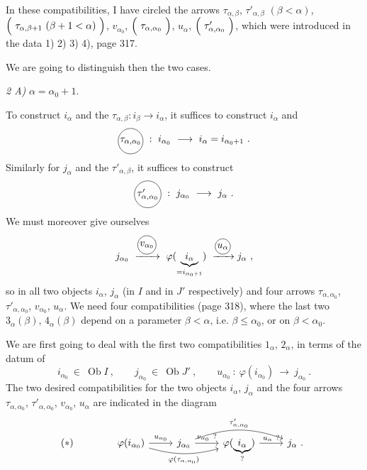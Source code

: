 \documentclass[11pt]{article}
\newcommand{\msp}[1]{\marginpar{\footnotesize [#1]}}
\newcommand{\circled}[1]{\tikz[baseline=(c.base)]\node[draw,circle,inner sep=1pt](c){#1};}
\newcommand{\Ob}{\operatorname{Ob}}
\begin{document}
In these compatibilities, I have circled the arrows $\tau_{\alpha,\beta}$, $\tau'_{\alpha,\beta}$ $(\beta<\alpha)$, $\Bigl(\ \tau_{\alpha,\beta+1}\ (\beta+1<\alpha)\ \Bigr)$, $v_{\alpha_0}$, $\Bigl(\ \tau_{\alpha,\alpha_0}\ \Bigr)$, $u_\alpha$, $\Bigl(\ \tau'_{\alpha,\alpha_0}\ \Bigr)$, which were introduced in the data 1) 2) 3) 4), page 317. %

\msp{page 319}

We are going to distinguish then the two cases.

\textit{2 A)} $\alpha=\alpha_0+1$.

To construct $i_\alpha$ and the $\tau_{\alpha,\beta}:i_\beta\longrightarrow i_\alpha$, it suffices to construct $i_\alpha$ and
\[
\circled{$\tau_{\alpha,\alpha_0}$}\ :\ i_{\alpha_0}\ \longrightarrow\ i_\alpha=i_{\alpha_0+1}\ .
\]
Similarly for $j_\alpha$ and the $\tau'_{\alpha,\beta}$, it suffices to construct
\[
\circled{$\tau'_{\alpha,\alpha_0}$}\ :\ j_{\alpha_0}\ \longrightarrow\ j_\alpha\ .
\]
We must moreover give ourselves
\[
j_{\alpha_0}\ \xrightarrow{\circled{$v_{\alpha_0}$}}\ \varphi(\underbrace{\,i_\alpha\,}_{=i_{\alpha_0+1}})\ \xrightarrow{\circled{$u_\alpha$}} j_\alpha\ ,
\]
so in all two objects $i_\alpha$, $j_\alpha$ (in $I$ and in $J'$ respectively) and four arrows $\tau_{\alpha,\alpha_0}$, $\tau'_{\alpha,\alpha_0}$, $v_{\alpha_0}$, $u_\alpha$. We need four compatibilities (page 318), where the last two $3_\alpha(\beta)$, $4_\alpha(\beta)$ depend on a parameter $\beta<\alpha$, i.e. $\beta\leqslant\alpha_0$, or on $\beta<\alpha_0$.

\msp{page 320: struck through}

\msp{page 321}

We are first going to deal with the first two compatibilities $1_\alpha$, $2_\alpha$, in terms of the datum of
\[
i_{\alpha_0}\ \in\ \Ob I\ ,\qquad j_{\alpha_0}\ \in\ \Ob J'\ ,\qquad u_{\alpha_0}\ :\ \varphi(i_{\alpha_0})\ \longrightarrow\ j_{\alpha_0}\ .
\]
The two desired compatibilities for the two objects $i_\alpha$, $j_\alpha$ and the four arrows $\tau_{\alpha,\alpha_0}$, $\tau'_{\alpha,\alpha_0}$, $v_{\alpha_0}$, $u_\alpha$ are indicated in the diagram
\[
(*)\qquad\qquad
\begin{tikzcd}
\varphi(i_{\alpha_0}) \arrow[r, "u_{\alpha_0}"] \arrow[rr, bend right=15, "\varphi(\tau_{\alpha,\alpha_0})"'] & j_{\alpha_0} \arrow[r, "v_{\alpha_0}\ ?"] \arrow[rr, bend left=20, "\tau'_{\alpha,\alpha_0}"] & \varphi(\underbrace{\,i_\alpha\,}_{?}) \arrow[r, "u_\alpha\ ?"] & j_\alpha\ .
\end{tikzcd}
\]
\end{document}
